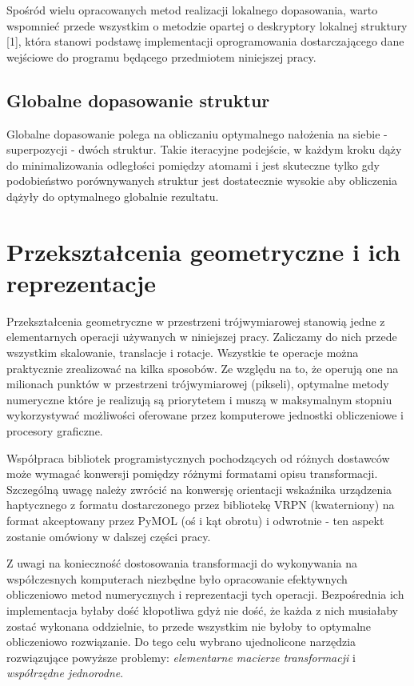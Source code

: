\documentclass[licencjacka]{pracamgr}
\begin{document}
Spośród wielu opracowanych metod realizacji lokalnego dopasowania, warto wspomnieć przede wszystkim o metodzie opartej o deskryptory lokalnej struktury [1], która stanowi podstawę implementacji oprogramowania dostarczającego dane wejściowe do programu będącego przedmiotem niniejszej pracy. 


\subsection{Globalne dopasowanie struktur} 
Globalne dopasowanie polega na obliczaniu optymalnego nałożenia na siebie - superpozycji - dwóch struktur. Takie iteracyjne podejście, w każdym kroku dąży do minimalizowania odległości pomiędzy atomami i jest skuteczne tylko gdy podobieństwo porównywanych struktur jest dostatecznie wysokie aby obliczenia dążyły do optymalnego globalnie rezultatu.


\section{Przekształcenia geometryczne i ich reprezentacje}
Przekształcenia geometryczne w przestrzeni trójwymiarowej stanowią jedne z elementarnych operacji używanych w niniejszej pracy. Zaliczamy do nich przede wszystkim skalowanie, translacje i rotacje. Wszystkie te operacje można praktycznie zrealizować na kilka sposobów. Ze względu na to, że operują one na milionach punktów w przestrzeni trójwymiarowej (pikseli), optymalne metody numeryczne które je realizują są priorytetem i muszą w maksymalnym stopniu wykorzystywać możliwości oferowane przez komputerowe jednostki obliczeniowe i procesory graficzne. 

Współpraca bibliotek programistycznych pochodzących od różnych dostawców może wymagać konwersji pomiędzy różnymi formatami opisu transformacji. Szczególną uwagę należy zwrócić na konwersję orientacji wskaźnika urządzenia haptycznego z formatu dostarczonego przez bibliotekę VRPN (kwaterniony) na format akceptowany przez PyMOL (oś i kąt obrotu) i odwrotnie - ten aspekt zostanie omówiony w dalszej części pracy.

Z uwagi na konieczność dostosowania transformacji do wykonywania na współczesnych komputerach niezbędne było opracowanie efektywnych obliczeniowo metod numerycznych i reprezentacji tych operacji. Bezpośrednia ich implementacja byłaby dość kłopotliwa gdyż nie dość, że każda z nich musiałaby zostać wykonana oddzielnie, to przede wszystkim nie byłoby to optymalne obliczeniowo rozwiązanie. Do tego celu wybrano ujednolicone narzędzia rozwiązujące powyższe problemy: \textit{elementarne macierze transformacji} i \textit{współrzędne jednorodne}.
\end{document}
